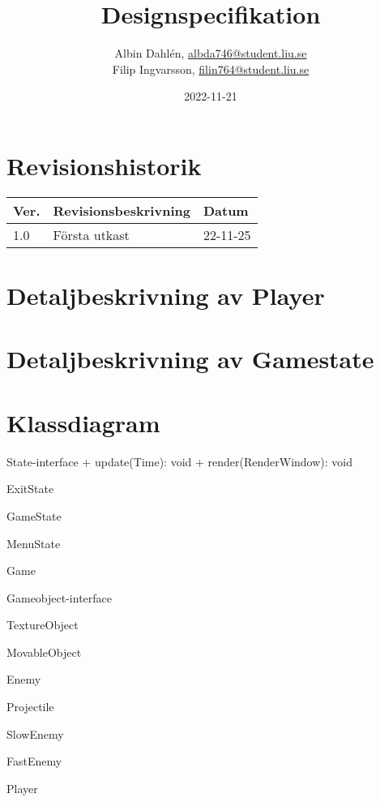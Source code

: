 \documentclass{TDP005mall}
\author{Albin Dahlén, \url{albda746@student.liu.se}\\
  Filip Ingvarsson, \url{filin764@student.liu.se}}
\title{Designspecifikation}
\date{2022-11-21}
\begin{document}
\projectpage
\section{Revisionshistorik}
\begin{table}[!h]
\begin{tabularx}{\linewidth}{|l|X|l|}
\hline
Ver. & Revisionsbeskrivning & Datum \\\hline
1.0 & Första utkast & 22-11-25 \\\hline
\end{tabularx}
\end{table}

\section{Detaljbeskrivning av Player}

\section{Detaljbeskrivning av Gamestate}

\section{Klassdiagram}

State-interface
+ update(Time): void
+ render(RenderWindow): void

ExitState

GameState

MenuState

Game

Gameobject-interface

TextureObject

MovableObject

Enemy

Projectile

SlowEnemy

FastEnemy

Player
\end{document}
